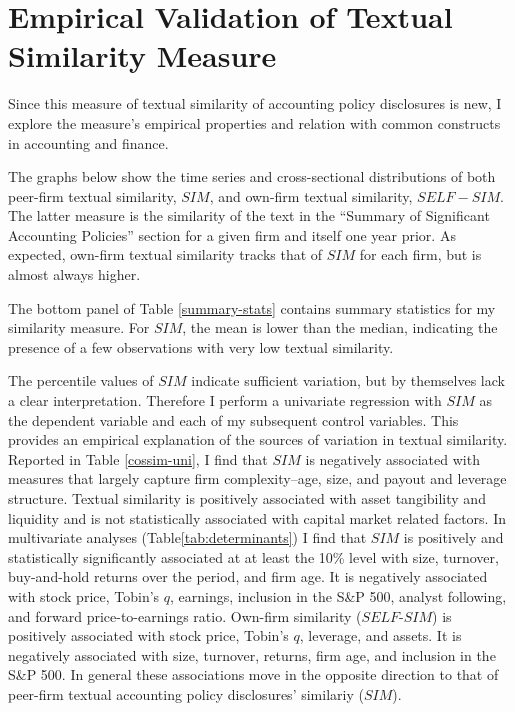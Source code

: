 \documentclass[thesis]{thesis-umich}
\begin{document}

\section{Empirical Validation of Textual Similarity Measure}\label{sec:validation}
Since this measure of textual similarity of accounting policy disclosures is new, I explore the measure's empirical properties and relation with common constructs in accounting and finance.

The graphs below show the time series and cross-sectional distributions of both peer-firm textual similarity, $SIM$, and own-firm textual similarity, $SELF-SIM$. The latter measure is the similarity of the text in the ``Summary of Significant Accounting Policies'' section for a given firm and itself one year prior. As expected, own-firm textual similarity tracks that of $SIM$ for each firm, but is almost always higher.

The bottom panel of Table \ref{summary-stats} contains summary statistics for my similarity measure. For $SIM$, the mean is lower than the median, indicating the presence of a few observations with very low textual similarity.

The percentile values of $SIM$ indicate sufficient variation, but by themselves lack a clear interpretation. Therefore I perform a univariate regression with $SIM$ as the dependent variable and each of my subsequent control variables. This provides an empirical explanation of the sources of variation in textual similarity. 
Reported in Table \ref{cossim-uni}, I find that $SIM$ is negatively associated with measures that largely capture firm complexity--age, size, and payout and leverage structure. Textual similarity is positively associated with asset tangibility and liquidity and is not statistically associated with capital market related factors. In multivariate analyses (Table\ref{tab:determinants}) I find that $SIM$ is positively and statistically significantly associated at at least the 10\% level with size, turnover, buy-and-hold returns over the period, and firm age. It is negatively associated with stock price, Tobin's $q$, earnings, inclusion in the S\&P 500, analyst following, and forward price-to-earnings ratio. Own-firm similarity ($SELF\text{-}SIM$) is positively associated with stock price, Tobin's $q$, leverage, and assets. It is negatively associated with size, turnover, returns, firm age, and inclusion in the S\&P 500. In general these associations move in the opposite direction to that of peer-firm textual accounting policy disclosures' similariy ($SIM$).
\end{document}
